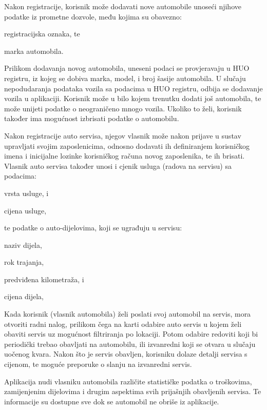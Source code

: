 		Nakon registracije, korisnik može dodavati nove automobile unoseći njihove podatke iz prometne dozvole, među kojima su obavezno:
		\begin{packed_item}
			\item registracijska oznaka, te
			\item marka automobila.
		\end{packed_item}
		
		Prilikom dodavanja novog automobila, uneseni podaci se provjeravaju u HUO registru, iz kojeg se dobiva marka, model, i broj šasije automobila. U slučaju nepodudaranja podataka vozila sa podacima u HUO registru, odbija se dodavanje vozila u aplikaciji. Korisnik može u bilo kojem trenutku dodati još automobila, te  može unijeti podatke o  neograničeno mnogo vozila. Ukoliko to želi, korisnik također ima mogućnost  izbrisati podatke o automobilu. 
		 
		Nakon registracije auto servisa, njegov vlasnik može nakon prijave u sustav upravljati svojim zaposlenicima, odnosno dodavati ih definiranjem korisničkog imena i inicijalne lozinke korisničkog računa novog zaposlenika, te ih brisati.
		Vlasnik auto servisa također unosi i cjenik usluga (radova na servisu) sa podacima:
		 \begin{packed_item}
		 	\item vrsta usluge, i
		 	\item cijena usluge,
		 \end{packed_item}
	 	 te podatke o auto-dijelovima, koji se ugrađuju u servisu:
	 	 \begin{packed_item}
	 	 	\item naziv dijela,
	 	 	\item rok trajanja,
	 	 	\item predviđena kilometraža, i
	 	 	\item cijena dijela,
	 	 \end{packed_item}
		
		Kada korisnik (vlasnik automobila) želi poslati svoj automobil na servis, mora otvoriti radni nalog, prilikom čega na karti odabire auto servis u kojem želi obaviti servis uz mogućnost filtriranja po lokaciji. Potom odabire redoviti koji bi periodički trebao obavljati na automobilu, ili izvanredni koji se otvara u slučaju uočenog kvara. Nakon što je servis obavljen, korisniku dolaze detalji servisa s cijenom, te moguće preporuke o slanju na izvanredni servis.
		
		Aplikacija nudi vlasniku automobila različite statističke podatka o troškovima, zamijenjenim dijelovima i drugim aspektima svih prijašnjih obavljenih servisa. Te informacije su dostupne sve dok se automobil ne obriše iz aplikacije.
		
